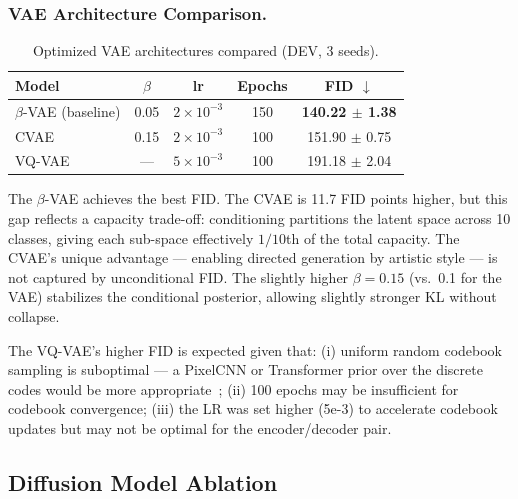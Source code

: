 \documentclass[runningheads]{llncs}
\begin{document}
\subsubsection{VAE Architecture Comparison.}

\begin{table}[htbp]
\caption{Optimized VAE architectures compared (DEV, 3 seeds).}\label{tab:vae_arch_compare}
\centering
\begin{tabular}{lcccc}
\toprule
Model & $\beta$ & lr & Epochs & FID $\downarrow$ \\
\midrule
$\beta$-VAE (baseline) & 0.05 & $2{\times}10^{-3}$ & 150 & \textbf{140.22 $\pm$ 1.38} \\
CVAE & 0.15 & $2{\times}10^{-3}$ & 100 & 151.90 $\pm$ 0.75 \\
VQ-VAE & — & $5{\times}10^{-3}$ & 100 & 191.18 $\pm$ 2.04 \\
\bottomrule
\end{tabular}
\end{table}

The $\beta$-VAE achieves the best FID. The CVAE is 11.7 FID points higher, but this gap reflects a capacity trade-off: conditioning partitions the latent space across 10 classes, giving each sub-space effectively $1/10$th of the total capacity. The CVAE's unique advantage — enabling directed generation by artistic style — is not captured by unconditional FID. The slightly higher $\beta=0.15$ (vs.\ 0.1 for the VAE) stabilizes the conditional posterior, allowing slightly stronger KL without collapse.

The VQ-VAE's higher FID is expected given that: (i) uniform random codebook sampling is suboptimal — a PixelCNN or Transformer prior over the discrete codes would be more appropriate~\cite{oord2017}; (ii) 100 epochs may be insufficient for codebook convergence; (iii) the LR was set higher (5e-3) to accelerate codebook updates but may not be optimal for the encoder/decoder pair.

\subsection{Diffusion Model Ablation}\label{sec:ablation_diff}
\end{document}
